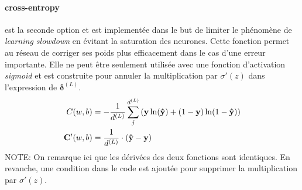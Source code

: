 \documentclass[11pt]{article}
\begin{document}
\paragraph{cross-entropy} est la seconde option et est implement\'ee dans le but
de limiter le ph\'enom\`ene de \emph{learning slowdown} en \'evitant la saturation des
neurones. Cette fonction permet au r\'eseau de corriger ses poids plus efficacement
dans le cas d'une erreur importante. Elle ne peut \^etre seulement utilis\'ee
avec une fonction d'activation {\em sigmoid} et est construite pour annuler la
multiplication par $\sigma'(z)$ dans l'expression de $\boldsymbol\delta^{(L)}$.
\begin{equation}
	\begin{aligned}
		C(w, b) &= -\frac{1}{d^{(L)}}\sum_{j}^{d^{(L)}}{\left({\bf y}\ln({\bf\hat y}) +
		(1-{\bf y})\ln(1- {\bf \hat y})\right)}  \\
		{\bf C'}(w, b) &= \frac{1}{d^{(L)}}\cdot({\bf\hat y} - {\bf y})
	\end{aligned}
\end{equation}
NOTE: On remarque ici que les d\'eriv\'ees des deux fonctions sont identiques. En
revanche, une condition dans le code est ajout\'ee pour supprimer la multiplication
par $\sigma'(z)$.

\newpage
\end{document}
